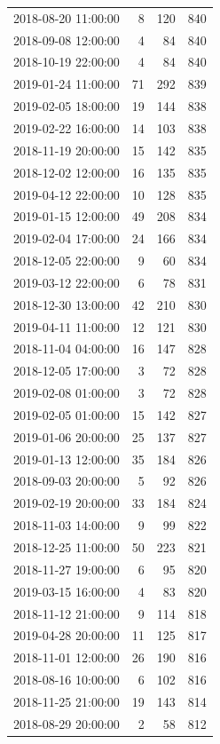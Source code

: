 \begin{tabular}{lrrr}
2018-08-20 11:00:00 & 8 & 120 & 840 \\
2018-09-08 12:00:00 & 4 & 84 & 840 \\
2018-10-19 22:00:00 & 4 & 84 & 840 \\
2019-01-24 11:00:00 & 71 & 292 & 839 \\
2019-02-05 18:00:00 & 19 & 144 & 838 \\
2019-02-22 16:00:00 & 14 & 103 & 838 \\
2018-11-19 20:00:00 & 15 & 142 & 835 \\
2018-12-02 12:00:00 & 16 & 135 & 835 \\
2019-04-12 22:00:00 & 10 & 128 & 835 \\
2019-01-15 12:00:00 & 49 & 208 & 834 \\
2019-02-04 17:00:00 & 24 & 166 & 834 \\
2018-12-05 22:00:00 & 9 & 60 & 834 \\
2019-03-12 22:00:00 & 6 & 78 & 831 \\
2018-12-30 13:00:00 & 42 & 210 & 830 \\
2019-04-11 11:00:00 & 12 & 121 & 830 \\
2018-11-04 04:00:00 & 16 & 147 & 828 \\
2018-12-05 17:00:00 & 3 & 72 & 828 \\
2019-02-08 01:00:00 & 3 & 72 & 828 \\
2019-02-05 01:00:00 & 15 & 142 & 827 \\
2019-01-06 20:00:00 & 25 & 137 & 827 \\
2019-01-13 12:00:00 & 35 & 184 & 826 \\
2018-09-03 20:00:00 & 5 & 92 & 826 \\
2019-02-19 20:00:00 & 33 & 184 & 824 \\
2018-11-03 14:00:00 & 9 & 99 & 822 \\
2018-12-25 11:00:00 & 50 & 223 & 821 \\
2018-11-27 19:00:00 & 6 & 95 & 820 \\
2019-03-15 16:00:00 & 4 & 83 & 820 \\
2018-11-12 21:00:00 & 9 & 114 & 818 \\
2019-04-28 20:00:00 & 11 & 125 & 817 \\
2018-11-01 12:00:00 & 26 & 190 & 816 \\
2018-08-16 10:00:00 & 6 & 102 & 816 \\
2018-11-25 21:00:00 & 19 & 143 & 814 \\
2018-08-29 20:00:00 & 2 & 58 & 812 \\

\end{tabular}
